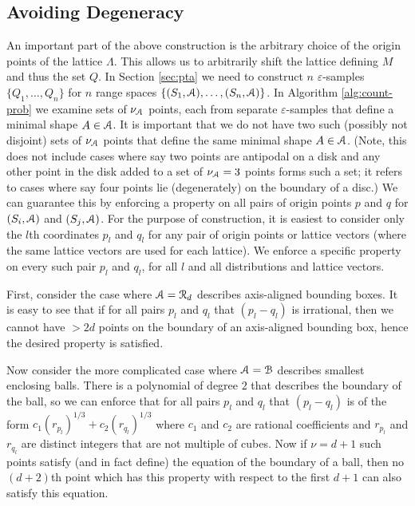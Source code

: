\documentclass{journal}
\newcommand{\eps}{\varepsilon}
\newcommand{\Eu}[1]{\ensuremath{\EuScript{#1}}}
\begin{document}
\subsection{Avoiding Degeneracy}
An important part of the above construction is the arbitrary choice of the origin points of the lattice $\Lambda$.  This allows us to arbitrarily shift the lattice defining $M$ and thus the set $Q$.  In Section \ref{sec:pta} we need to construct $n$ $\eps$-samples $\{Q_1, \ldots, Q_n\}$ for $n$ range spaces $\{(S_1, \Eu{A}), \ldots, (S_n, \Eu{A})\}$.
In Algorithm \ref{alg:count-prob} we examine sets of $\nu_{\Eu{A}}$ points, each from separate $\eps$-samples that define a minimal shape $A \in \Eu{A}$.  It is important that we do not have two such (possibly not disjoint) sets of $\nu_{\Eu{A}}$ points that define the same minimal shape $A \in \Eu{A}$.  (Note, this does not include cases where say two points are antipodal on a disk and any other point in the disk added to a set of $\nu_{\Eu{A}}=3$ points forms such a set; it refers to cases where say four points lie (degenerately) on the boundary of a disc.)
We can guarantee this by enforcing a property on all pairs of origin points $p$ and $q$ for $(S_i, \Eu{A})$ and $(S_j, \Eu{A})$.  For the purpose of construction, it is easiest to consider only the $l$th coordinates $p_l$ and $q_l$ for any pair of origin points or lattice vectors (where the same lattice vectors are used for each lattice).  We enforce a specific property on every such pair $p_l$ and $q_l$, for all $l$ and all distributions and lattice vectors.

First, consider the case where $\Eu{A} = \Eu{R}_d$ describes axis-aligned bounding boxes.  It is easy to see that if for all pairs $p_l$ and $q_l$ that $(p_l - q_l)$ is irrational, then we cannot have $>2d$ points on the boundary of an axis-aligned bounding box, hence the desired property is satisfied.

Now consider the more complicated case where $\Eu{A} = \Eu{B}$ describes smallest enclosing balls.  There is a polynomial of degree $2$ that describes the boundary of the ball, so we can enforce that for all pairs $p_l$ and $q_l$ that $(p_l - q_l)$ is of the form $c_1 (r_{p_l})^{1/3} + c_2 (r_{q_l})^{1/3}$ where $c_1$ and $c_2$ are rational coefficients and $r_{p_l}$ and $r_{q_l}$ are distinct integers that are not multiple of cubes.    Now if $\nu = d+1$ such points satisfy (and in fact define) the equation of the boundary of a ball, then no $(d+2)$th point which has this property with respect to the first $d+1$ can also satisfy this equation.
\end{document}
